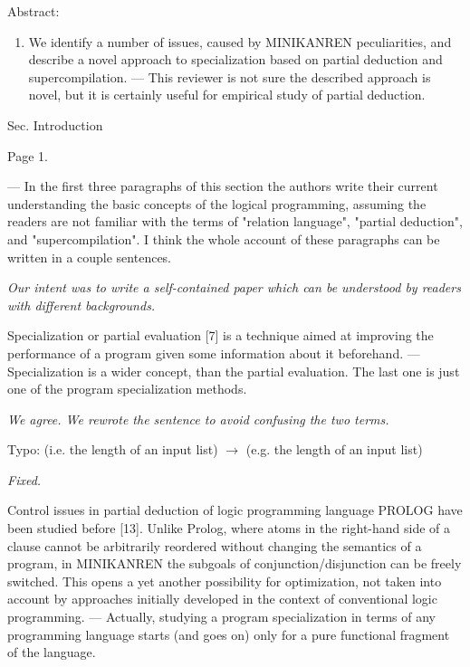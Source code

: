 Abstract:
\begin{enumerate}
  \item  We identify a number of issues, caused by MINIKANREN peculiarities, and describe a novel approach to specialization based on partial deduction and supercompilation.
  --- This reviewer is not sure the described approach is novel, but it is certainly useful for empirical study of partial deduction.
\end{enumerate}

Sec. Introduction

Page 1.
\begin{enumerate}
  \setcounter{enumi}{1}
  \item{--- In the first three paragraphs of this section the authors write their current understanding the basic concepts of the logical programming, assuming the readers are not familiar with the terms of  "relation language", "partial deduction", and "supercompilation". I think the whole account of these paragraphs can be written in a couple sentences.

  \emph{Our intent was to write a self-contained paper which can be understood by readers with different backgrounds.}}

  \item{Specialization or partial evaluation [7] is a technique aimed at improving the performance of a program given some information about it beforehand.
  --- Specialization is a wider concept, than the partial evaluation. The last one is just one of the program specialization methods.

  \emph{We agree. We rewrote the sentence to avoid confusing the two terms.}}

  \item{Typo:
  (i.e. the length of an input list) $\to$ (e.g. the length of an input list)

  \emph{Fixed.}

  \item{Control issues in partial deduction of logic programming language PROLOG have been studied before [13]. Unlike Prolog, where atoms in the right-hand side of a clause cannot be arbitrarily reordered without changing the semantics of a program, in MINIKANREN the subgoals of conjunction/disjunction can be freely switched. This opens a yet another possibility for optimization, not taken into account by approaches initially developed in the context of conventional logic programming.
  --- Actually, studying a program specialization in terms of any programming language starts (and goes on) only for a pure functional fragment of the language.
  }
  }

\end{enumerate}


